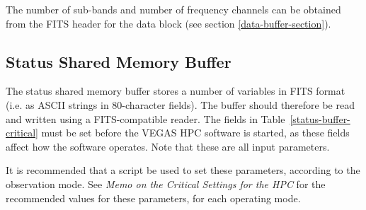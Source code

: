 \documentclass[11pt]{article} %
\begin{document}
The number of sub-bands and number of frequency channels can be obtained from the FITS header for the data block (see section \ref{data-buffer-section}).

\subsection{Status Shared Memory Buffer}

The status shared memory buffer stores a number of variables in FITS format (i.e. as ASCII strings in 80-character fields). The buffer should therefore be read and written using a FITS-compatible reader. The fields in Table~\ref{status-buffer-critical} must be set before the VEGAS HPC software is started, as these fields affect how the software operates. Note that these are all input parameters.

It is recommended that a script be used to set these parameters, according to the observation mode. See {\em Memo on the Critical Settings for the HPC} for the recommended values for these parameters, for each operating mode.
\end{document}
